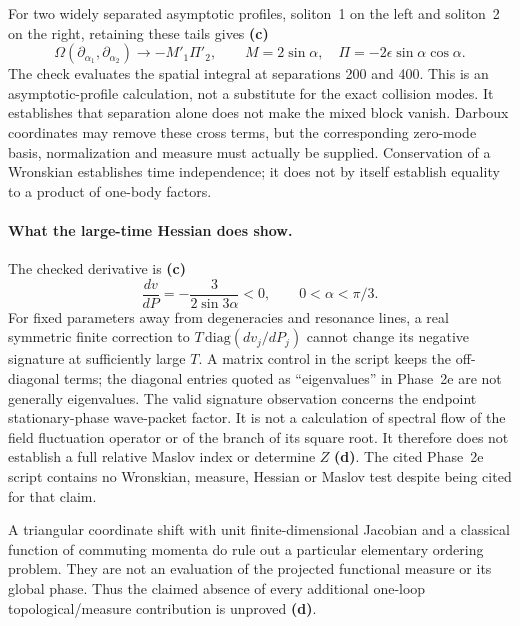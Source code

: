 \documentclass[11pt]{article}
\newcommand{\Lc}{\textbf{(c)}}
\newcommand{\Ld}{\textbf{(d)}}
\begin{document}
For two widely separated asymptotic profiles, soliton~1 on the left and
soliton~2 on the right, retaining these tails gives \Lc
\begin{equation}\label{eq:mixed}
 \Omega(\partial_{\alpha_1},\partial_{\alpha_2})
 \longrightarrow -M'_1\Pi'_2,\qquad
 M=2\sin\alpha,\quad \Pi=-2\epsilon\sin\alpha\cos\alpha.\tag{c}
\end{equation}
The check evaluates the spatial integral at separations 200 and 400.
This is an asymptotic-profile calculation, not a substitute for the exact
collision modes. It establishes that separation alone does not make the
mixed block vanish. Darboux coordinates may remove these cross terms, but
the corresponding zero-mode basis, normalization and measure must actually
be supplied. Conservation of a Wronskian establishes time independence;
it does not by itself establish equality to a product of one-body factors.

\paragraph{What the large-time Hessian does show.}
The checked derivative is \Lc
\begin{equation}
 \frac{dv}{dP}=-\frac{3}{2\sin3\alpha}<0,
 \qquad 0<\alpha<\pi/3.\tag{c}
\end{equation}
For fixed parameters away from degeneracies and resonance lines, a real
symmetric finite correction to $T\,\mathrm{diag}(dv_j/dP_j)$ cannot change its
negative signature at sufficiently large $T$. A matrix control in the script
keeps the off-diagonal terms; the diagonal entries quoted as ``eigenvalues''
in Phase~2e are not generally eigenvalues. The valid signature observation
concerns the endpoint stationary-phase wave-packet factor. It is not a
calculation of spectral flow of the field fluctuation operator or of the
branch of its square root. It therefore does not establish a full relative
Maslov index or determine $Z$ \Ld. The cited Phase~2e script contains no
Wronskian, measure, Hessian or Maslov test despite being cited for that claim.

A triangular coordinate shift with unit finite-dimensional Jacobian and a
classical function of commuting momenta do rule out a particular elementary
ordering problem. They are not an evaluation of the projected functional
measure or its global phase. Thus the claimed absence of every additional
one-loop topological/measure contribution is unproved \Ld.
\end{document}
